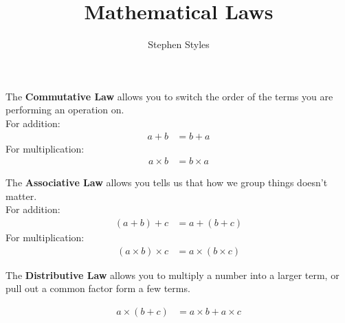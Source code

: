 \documentclass[16pt]{article}
\title{Mathematical Laws}
\author{Stephen Styles}
\theoremstyle{remark}
\begin{document}
\maketitle

The \textbf{Commutative Law} allows you to switch the order of the terms you are performing an operation on.\\

For addition:
\begin{align*}
a+b &= b +a
\end{align*}
For multiplication:
\begin{align*}
a\times b &= b\times a
\end{align*}

The \textbf{Associative Law} allows you tells us that how we group things doesn't matter.\\

For addition:
\begin{align*}
(a + b) + c &= a + (b + c)
\end{align*}
For multiplication:
\begin{align*}
(a\times b) \times c &= a \times (b \times c)
\end{align*}

The \textbf{Distributive Law} allows you to multiply a number into a larger term, or pull out a common factor form a few terms.

\begin{align*}
a\times (b+c) &= a\times b + a \times c
\end{align*}
\end{document}
